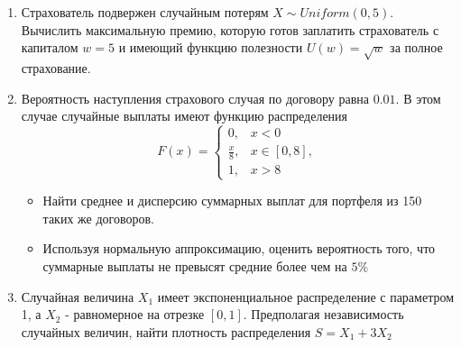 \documentclass[12pt, letterpaper]{article}
\begin{document}
\begin{enumerate}
	\item 	
	Страхователь подвержен случайным потерям $X \sim Uniform(0, 5)$.
	Вычислить максимальную премию, которую готов заплатить страхователь с капиталом $w=5$ и имеющий функцию полезности $U(w) = \sqrt{w}$ за полное страхование.

	\item
	Вероятность наступления страхового случая по договору равна $0.01$. В этом случае случайные выплаты имеют функцию распределения
	\[
	F(x) = 
	\begin{cases}
		0, & x < 0\\
		\frac{x}{8}, & x \in [0, 8],\\
		1, & x > 8
	\end{cases}
	\]
	\begin{itemize}
		\item Найти среднее и дисперсию суммарных выплат для портфеля из 150 таких же договоров.
		\item Используя нормальную аппроксимацию, оценить вероятность того, что суммарные выплаты не превысят средние более чем на $5\%$
	\end{itemize}
	

	\item
	Случайная величина $X_1$ имеет экспоненциальное распределение с параметром 1, а $X_2$ - равномерное на отрезке $[0, 1]$.
	Предполагая независимость случайных величин, найти плотность распределения $S = X_1 + 3X_2$
\end{enumerate}
\end{document}
